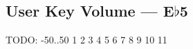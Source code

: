 \subsection{User Key Volume --- E$\flat$5}









































TODO: -50..50
1
2
3
4
5
6
7
8
9
10
11
